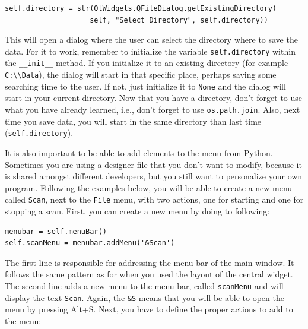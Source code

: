 \begin{verbatim}
self.directory = str(QtWidgets.QFileDialog.getExistingDirectory(
                    self, "Select Directory", self.directory))
\end{verbatim}

This will open a dialog where the user can select the directory where to
save the data. For it to work, remember to initialize the variable
\texttt{self.directory} within the \texttt{__init__} method. If you
initialize it to an existing directory (for example
\texttt{C:\textbackslash{}\textbackslash{}Data}), the dialog will start
in that specific place, perhaps saving some searching time to the user.
If not, just initialize it to \texttt{None} and the dialog will start in
your current directory. Now that you have a directory, don't forget to
use what you have already learned, i.e., don't forget to use
\texttt{os.path.join}. Also, next time you save data, you will start in
the same directory than last time (\texttt{self.directory}).


It is also important to be able to add elements to the menu from Python.
Sometimes you are using a designer file that you don't want to modify,
because it is shared amongst different developers, but you still want to
personalize your own program. Following the examples below, you will be
able to create a new menu called \texttt{Scan}, next to the
\texttt{File} menu, with two actions, one for starting and one for
stopping a scan. First, you can create a new menu by doing to following:

\begin{verbatim}
menubar = self.menuBar()
self.scanMenu = menubar.addMenu('&Scan')
\end{verbatim}

The first line is responsible for addressing the menu bar of the main
window. It follows the same pattern as for when you used the layout of
the central widget. The second line adds a new menu to the menu bar,
called \texttt{scanMenu} and will display the text \texttt{Scan}. Again,
the \texttt{&S} means that you will be able to open the menu by
pressing Alt+S. Next, you have to define the proper actions to add to
the menu:


